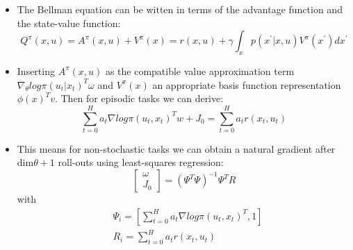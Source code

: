 {\begin{pcolumn}
\vspace*{-28mm}
%
{\large
\begin{itemize}
	\item The Bellman equation can be witten in terms of 	the advantage function and the state-value function:
\begin{equation}
	Q^\pi (x, u) = A^\pi(x, u) + V^\pi(x) = r(x,u) + \gamma \int_x p(x^{'}|x,u)V^\pi(x^{'})dx^{'}
\end{equation}
	\item Inserting $A^\pi(x,u)$ as the compatible value approximation term $\nabla_\theta log \pi(u_t|x_t)^T\omega$ and $V^\pi(x)$ an appropriate basis function representation $\phi(x)^Tv$. Then for episodic tasks we can derive:
\begin{equation}
	\sum_{t=0}^H a_t \nabla log \pi(u_t, x_t)^Tw + J_0 = \sum_{t=0}^H a_t r(x_t, u_t)
\end{equation}
	\item This means for non-stochastic tasks we can obtain a natural gradient after dim$\theta + 1$ roll-outs using least-squares regression:
\begin{equation}
	\left[
	\begin{matrix}
		\omega \\
		J_0
	\end{matrix}
	\right] = (\Psi^T \Psi)^{-1}\Psi^T R
\end{equation}
with
\begin{eqnarray}
	& \Psi_i = \left[\sum_{t=0}^{H}a_t \nabla log \pi (u_t, x_t)^T, 1 \right] \\
	& R_i = \sum_{t=0}^{H}a_t r(x_t, u_t)
\end{eqnarray}


\end{itemize}}
\end{pcolumn}}
